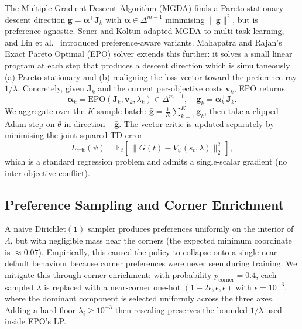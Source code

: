 \documentclass[12pt, letterpaper]{article}
\begin{document}
The Multiple Gradient Descent Algorithm (MGDA) \cite{desideri2012mgda} finds a Pareto-stationary descent direction $\bm{g} = \bm{\alpha}^{\top} \bm{J}_k$ with $\bm{\alpha} \in \Delta^{m-1}$ minimising $\|\bm{g}\|^2$, but is preference-agnostic. Sener and Koltun \cite{sener2018multitask} adapted MGDA to multi-task learning, and Lin et al.\ \cite{lin2019pareto} introduced preference-aware variants. Mahapatra and Rajan's Exact Pareto Optimal (EPO) solver \cite{mahapatra2020epo} extends this further: it solves a small linear program at each step that produces a descent direction which is simultaneously (a) Pareto-stationary and (b) realigning the loss vector toward the preference ray $1/\lambda$. Concretely, given $\bm{J}_k$ and the current per-objective costs $\bm{v}_k$, EPO returns
\begin{equation}
    \bm{\alpha}_k = \mathrm{EPO}(\bm{J}_k, \bm{v}_k, \lambda_k) \in \Delta^{m-1}, \quad \bm{g}_k = \bm{\alpha}_k^{\top} \bm{J}_k.
\end{equation}
We aggregate over the $K$-sample batch: $\bar{\bm{g}} = \tfrac{1}{K}\sum_{k=1}^{K} \bm{g}_k$, then take a clipped Adam step on $\theta$ in direction $-\bar{\bm{g}}$. The vector critic is updated separately by minimising the joint squared TD error
\begin{equation}
    L_{\mathrm{crit}}(\psi) = \mathbb{E}_t\!\left[\,\big\|G(t) - V_\psi(s_t,\lambda)\big\|^2_2\,\right],
\end{equation}
which is a standard regression problem and admits a single-scalar gradient (no inter-objective conflict).

\subsection{Preference Sampling and Corner Enrichment}
\label{sec:method-sample}
A naive Dirichlet$(\bm{1})$ sampler produces preferences uniformly on the interior of $\Lambda$, but with negligible mass near the corners (the expected minimum coordinate is $\approx 0.07$). Empirically, this caused the policy to collapse onto a single near-default behaviour because corner preferences were never seen during training. We mitigate this through corner enrichment: with probability $p_{\text{corner}} = 0.4$, each sampled $\lambda$ is replaced with a near-corner one-hot $(1{-}2\epsilon, \epsilon, \epsilon)$ with $\epsilon = 10^{-3}$, where the dominant component is selected uniformly across the three axes. Adding a hard floor $\lambda_i \ge 10^{-3}$ then rescaling preserves the bounded $1/\lambda$ used inside EPO's LP.
\end{document}
